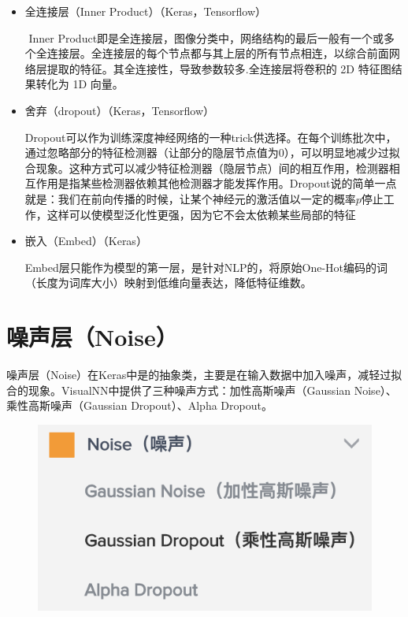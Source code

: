 \documentclass{progbookcn}
\begin{document}
\begin{itemize}
\item 全连接层（Inner Product）（Keras，Tensorflow）

  ​	Inner Product即是全连接层，图像分类中，网络结构的最后一般有一个或多个全连接层。全连接层的每个节点都与其上层的所有节点相连，以综合前面网络层提取的特征。其全连接性，导致参数较多.全连接层将卷积的 2D 特征图结果转化为 1D 向量。

\item 舍弃（dropout）（Keras，Tensorflow）

  ​	Dropout可以作为训练深度神经网络的一种trick供选择。在每个训练批次中，通过忽略部分的特征检测器（让部分的隐层节点值为0），可以明显地减少过拟合现象。这种方式可以减少特征检测器（隐层节点）间的相互作用，检测器相互作用是指某些检测器依赖其他检测器才能发挥作用。Dropout说的简单一点就是：我们在前向传播的时候，让某个神经元的激活值以一定的概率$p$停止工作，这样可以使模型泛化性更强，因为它不会太依赖某些局部的特征

\item 嵌入（Embed）（Keras）

  ​	Embed层只能作为模型的第一层，是针对NLP的，将原始One-Hot编码的词（长度为词库大小）映射到低维向量表达，降低特征维数。
\end{itemize}


\section{ 噪声层（Noise）}

噪声层（Noise）在Keras中是的抽象类，主要是在输入数据中加入噪声，减轻过拟合的现象。VisualNN中提供了三种噪声方式：加性高斯噪声（Gaussian Noise）、乘性高斯噪声（Gaussian Dropout）、Alpha Dropout。
\begin{figure}[H]
  \centering
  \includegraphics[scale = 0.6]{Noise_layer.png}
\end{figure}
\end{document}
